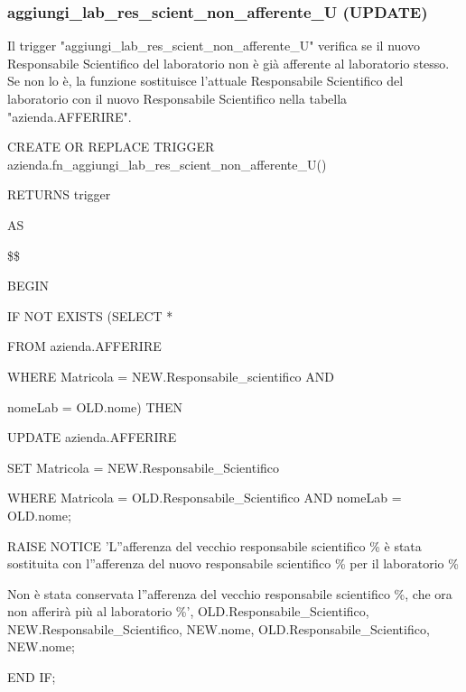 \newpage

        \subsubsection{aggiungi\_lab\_res\_scient\_non\_afferente\_U (UPDATE)}
        Il trigger "aggiungi\_lab\_res\_scient\_non\_afferente\_U" verifica se il nuovo Responsabile Scientifico del laboratorio non è già afferente al laboratorio stesso. Se non lo è, la funzione sostituisce l'attuale Responsabile Scientifico del laboratorio con il nuovo Responsabile Scientifico nella tabella "azienda.AFFERIRE".
        \ttfamily
            \begin{flushleft}
                \begin{description}
                    \item CREATE OR REPLACE TRIGGER azienda.fn\_aggiungi\_lab\_res\_scient\_non\_afferente\_U()  
                    \item RETURNS trigger
                    \item AS
                    \item \$\$
                    \item BEGIN 
                    \begin{description}
                        \item IF NOT EXISTS (SELECT *
                        \item FROM azienda.AFFERIRE
                        \item WHERE Matricola = NEW.Responsabile\_scientifico AND
                        \item nomeLab = OLD.nome) THEN
                        \begin{description}
                            \item UPDATE azienda.AFFERIRE
                            \item SET Matricola = NEW.Responsabile\_Scientifico
                            \item WHERE Matricola = OLD.Responsabile\_Scientifico AND nomeLab = OLD.nome;

                            \vspace{0.5cm}

                            \item RAISE NOTICE 'L''afferenza del vecchio responsabile scientifico \% è stata sostituita con l''afferenza del nuovo responsabile scientifico \% per il laboratorio \%
                            \item Non è stata conservata l''afferenza del vecchio responsabile scientifico \%, che ora non afferirà più al laboratorio \%', OLD.Responsabile\_Scientifico, NEW.Responsabile\_Scientifico, NEW.nome, OLD.Responsabile\_Scientifico, NEW.nome;
                        \end{description}
                        \item END IF;


\end{description}
\end{description}
\end{flushleft}
